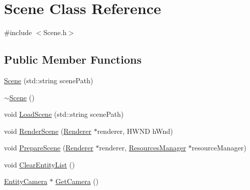 \hypertarget{class_scene}{\section{Scene Class Reference}
\label{class_scene}
}


{\ttfamily \#include $<$Scene.\-h$>$}

\subsection*{Public Member Functions}
\begin{DoxyCompactItemize}
\item 
\hyperlink{class_scene_a7b12367f5cd8d6b11ac4b06609a003d6}{Scene} (std\-::string scene\-Path)
\item 
\hyperlink{class_scene_a3b8cec2e32546713915f8c6303c951f1}{$\sim$\-Scene} ()
\item 
void \hyperlink{class_scene_a2338f5b2e5f8a49a053cb5aa5f68bdff}{Load\-Scene} (std\-::string scene\-Path)
\item 
void \hyperlink{class_scene_ae886662a576f5590e96a720f8c91139c}{Render\-Scene} (\hyperlink{class_renderer}{Renderer} $\ast$renderer, H\-W\-N\-D h\-Wnd)
\item 
void \hyperlink{class_scene_a8874dfdc9b24a9f1363b48bde2f94b98}{Prepare\-Scene} (\hyperlink{class_renderer}{Renderer} $\ast$renderer, \hyperlink{class_resources_manager}{Resources\-Manager} $\ast$resource\-Manager)
\item 
void \hyperlink{class_scene_a882579bd3a7d678172cfd702fb50c899}{Clear\-Entity\-List} ()
\item 
\hyperlink{class_entity_camera}{Entity\-Camera} $\ast$ \hyperlink{class_scene_ae906c883bc1ef85741c8843baee1c4aa}{Get\-Camera} ()
\end{DoxyCompactItemize}



